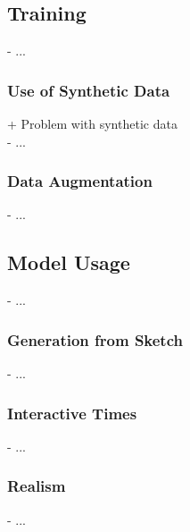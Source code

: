 \subsection{Training}
- ...

\subsubsection{Use of Synthetic Data}
+ Problem with synthetic data \\
- ...

\subsubsection{Data Augmentation}
- ...

\subsection{Model Usage}
- ...

\subsubsection{Generation from Sketch}
- ...

\subsubsection{Interactive Times}
- ...

\subsubsection{Realism}
- ...
